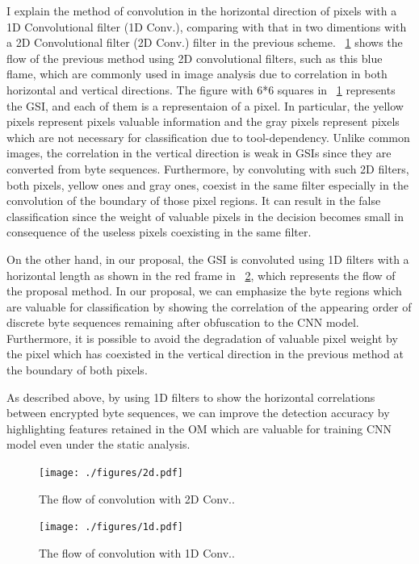 \documentclass{ieeeaccess}
\begin{document}
I explain the method of convolution in the horizontal direction of pixels with a 1D Convolutional filter (1D Conv.), comparing with that in two dimentions with a 2D Convolutional filter (2D Conv.) filter in the previous scheme.
\figurename~\ref{fig:2d} shows the flow of the previous method using 2D convolutional filters, such as this blue flame, which are commonly used in image analysis due to correlation in both horizontal and vertical directions.
The figure with 6*6 squares in \figurename~\ref{fig:2d} represents the GSI, and each of them is a representaion of a pixel.
In particular, the yellow pixels represent pixels valuable information and the gray pixels represent pixels which are not necessary for classification due to tool-dependency.
Unlike common images, the correlation in the vertical direction is weak in GSIs since they are converted from byte sequences.
Furthermore, by convoluting with such 2D filters, both pixels, yellow ones and gray ones, coexist in the same filter especially in the convolution of the boundary of those pixel regions.
It can result in the false classification since the weight of valuable pixels in the decision becomes small in consequence of the useless pixels coexisting in the same filter.

On the other hand, in our proposal, the GSI is convoluted using 1D filters with a horizontal length as shown in the red frame in \figurename~\ref{fig:1d}, which represents the flow of the proposal method.
In our proposal, we can emphasize the byte regions which are valuable for classification by showing the correlation of the appearing order of discrete byte sequences remaining after obfuscation to the CNN model.
Furthermore, it is possible to avoid the degradation of valuable pixel weight by the pixel which has coexisted in the vertical direction in the previous method at the boundary of both pixels.

As described above, by using 1D filters to show the horizontal correlations between encrypted byte sequences, we can improve the detection accuracy by highlighting features retained in the OM which are valuable for training CNN model even under the static analysis.

\begin{figure}[h]
 \centering
 \texttt{[image: ./figures/2d.pdf]}
 \caption{The flow of convolution with 2D Conv..} 
 \label{fig:2d}
\end{figure}
\begin{figure}[h]
 \centering
 \texttt{[image: ./figures/1d.pdf]}
 \caption{The flow of convolution with 1D Conv..} 
 \label{fig:1d}
\end{figure}
\end{document}
